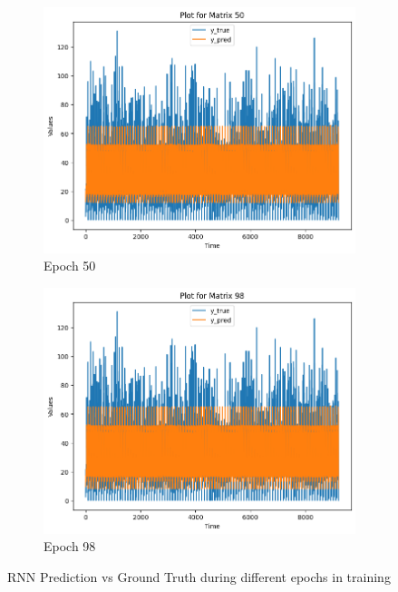 \documentclass[a4paper, article, oneside, USenglish, IN5460]{memoir}
\begin{document}
\begin{figure}
\begin{subfigure}[b]{0.475\textwidth}
            \centering 
            \includegraphics[width=\textwidth]{figures/RNN-pred/rnn50.png}
            {{\small Epoch 50}}    
        \end{subfigure}
        \hfill
        \begin{subfigure}[b]{0.475\textwidth}   
            \centering 
            \includegraphics[width=\textwidth]{figures/RNN-pred/rnn98.png}
            {{\small Epoch 98}}
        \end{subfigure}
        \caption{RNN Prediction vs Ground Truth during different epochs in training} 
        \label{rnn-pred}
\end{figure}
\end{document}
